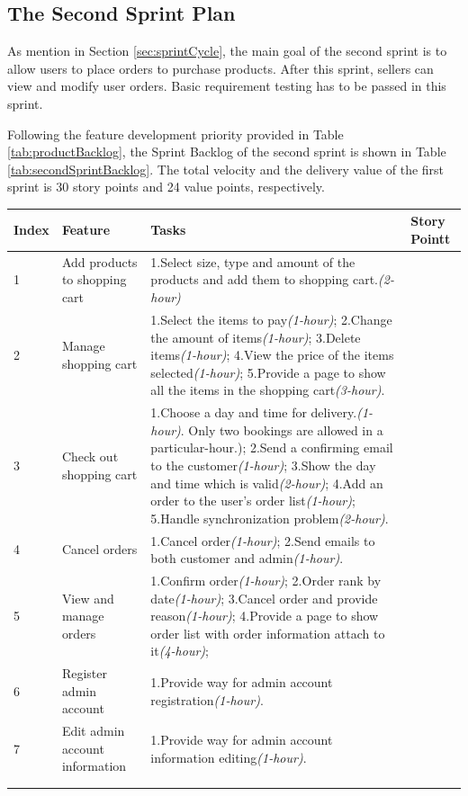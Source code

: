 \documentclass{report}
\begin{document}
\subsection{The Second Sprint Plan}
\label{theSecondSprintPlan}
As mention in Section \ref{sec:sprintCycle}, the main goal of the second sprint is to allow users to place orders to purchase products. After this sprint, sellers can view and modify user orders. Basic requirement testing has to be passed in this sprint.

Following the feature development priority provided in Table \ref{tab:productBacklog}, the Sprint Backlog of the second sprint is shown in Table \ref{tab:secondSprintBacklog}. The total velocity and the delivery value of the first sprint is 30 story points and 24 value points, respectively. 

\begin{tabularx}{0.95\linewidth}{%
  l%
  >{\raggedright\arraybackslash}p{2cm}%
  >{\raggedright\arraybackslash}X%
  >{\raggedright\arraybackslash}p{1cm}}
  \toprule
  Index & Feature & Tasks & Story Pointt\\
  \midrule
  1
  & Add products to shopping cart
  & 1.Select size, type and amount of the products and add them to shopping cart.\textit{(2-hour)}
  & 2
  \\
  \midrule
  2
  & Manage shopping cart
  & 1.Select the items to pay\textit{(1-hour)}; 2.Change the amount of items\textit{(1-hour)}; 3.Delete items\textit{(1-hour)}; 4.View the price of the items selected\textit{(1-hour)}; 5.Provide a page to show all the items in the shopping cart\textit{(3-hour)}.
  & 8
  \\
  \midrule
  3
  & Check out shopping cart
  & 1.Choose a day and time for delivery.\textit{(1-hour)}. Only two bookings are allowed in a particular-hour.); 2.Send a confirming email to the customer\textit{(1-hour)}; 3.Show the day and time which is valid\textit{(2-hour)}; 4.Add an order to the user's order list\textit{(1-hour)}; 5.Handle synchronization problem\textit{(2-hour)}.
  & 8
  \\
  \midrule
  4
  & Cancel orders
  & 1.Cancel order\textit{(1-hour)}; 2.Send emails to both customer and admin\textit{(1-hour)}.
  & 2
  \\
  \midrule
  5
  & View and manage orders
  & 1.Confirm order\textit{(1-hour)}; 2.Order rank by date\textit{(1-hour)}; 3.Cancel order and provide reason\textit{(1-hour)}; 4.Provide a page to show order list with order information attach to it\textit{(4-hour)};
  & 8
  \\
  \midrule
  6
  & Register admin account
  & 1.Provide way for admin account registration\textit{(1-hour)}.
  & 1
  \\
  \midrule
  7
  & Edit admin account information
  & 1.Provide way for admin account information editing\textit{(1-hour)}.
  & 1
  \\
  \bottomrule
  \\
  \caption{The Second Sprint Backlog (May 11 - May 25)}  
  \label{tab:secondSprintBacklog}
\end{tabularx}  
\end{document}
